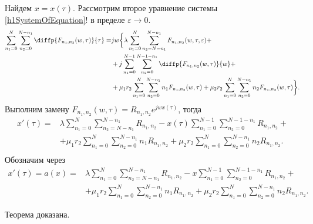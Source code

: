 Найдем $x=x(\tau)$. Рассмотрим второе уравнение системы \eqref{h1SystemOfEquation}! в пределе $\varepsilon \rightarrow 0$.
\begin{align*}
\sum_{n_1=0}^N\sum_{n_2=0}^{N-n_1} \diffp{F_{n_{1}, n_{2}}(w,\tau)}{\tau}=
&jw\bigg\{\lambda \sum_{n_1=0}^N\sum_{n_2=N-n_1}^{N-n_1} 
F_{n_{1}, n_{2}}(w,\tau, \varepsilon)+\\
&+ j\sum_{n_1=0}^{N-1}\sum_{n_2=0}^{N-1-n_1} 
\diffp{F_{n_{1}, n_{2}}(w,\tau)}{w}+\\
&+\mu_1 r_2 \sum_{n_1=0}^{N}\sum_{n_2=0}^{N-n_1} 
n_1 F_{n_{1}, n_{2}}(w,\tau)
+\mu_2 r_2 \sum_{n_1=0}^{N}\sum_{n_2=0}^{N-n_1} 
n_2 F_{n_{1}, n_{2}}(w,\tau)\bigg\}.\\
\end{align*} 
Выполним замену $F_{n_{1}, n_{2}}(w,\tau)=R_{n_{1}, n_{2}}e^{jwx(\tau)}$, тогда
\begin{equation*}
	\begin{aligned}
		x'(\tau) =
		&\lambda \sum_{n_1=0}^N\sum_{n_2=N-n_1}^{N-n_1} 
		R_{n_{1}, n_{2}}
		- x(\tau)\sum_{n_1=0}^{N-1}\sum_{n_2=0}^{N-1-n_1} 
		R_{n_{1}, n_{2}}+\\
		&+\mu_1 r_2 \sum_{n_1=0}^{N}\sum_{n_2=0}^{N-n_1} 
		n_1 R_{n_{1}, n_{2}}
		+\mu_2 r_2 \sum_{n_1=0}^{N}\sum_{n_2=0}^{N-n_1} 
		n_2 R_{n_{1}, n_{2}}.\\
	\end{aligned}
\end{equation*}
Обозначим через
\begin{equation}\label{a_func}
	\begin{aligned}
		x'(\tau)=a(x)=&\lambda \sum_{n_1=0}^N\sum_{n_2=N-n_1}^{N-n_1} 
		R_{n_{1}, n_{2}}
		- x\sum_{n_1=0}^{N-1}\sum_{n_2=0}^{N-1-n_1} 
		R_{n_{1}, n_{2}}+\\
		&+\mu_1 r_2 \sum_{n_1=0}^{N}\sum_{n_2=0}^{N-n_1} 
		n_1 R_{n_{1}, n_{2}}
		+\mu_2 r_2 \sum_{n_1=0}^{N}\sum_{n_2=0}^{N-n_1} 
		n_2 R_{n_{1}, n_{2}}.
	\end{aligned}
\end{equation}

Теорема доказана.